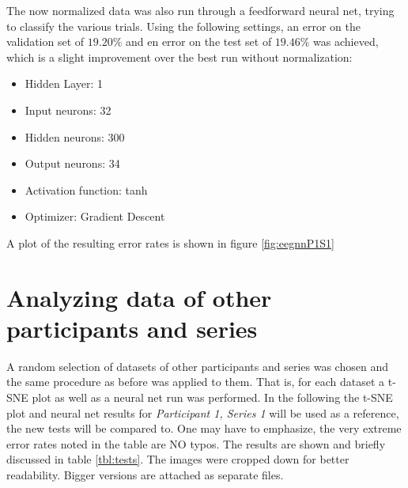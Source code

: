 \documentclass{article} %
\begin{document}
The now normalized data was also run through a feedforward neural net, trying to classify the various trials. Using the following settings, an error on the validation set of $19.20\%$ and en error on the test set of $19.46\%$ was achieved, which is a slight improvement over the best run without normalization:
\begin{itemize}
	\item Hidden Layer: 1
	\item Input neurons: 32
	\item Hidden neurons: 300
	\item Output neurons: 34
	\item Activation function: tanh
	\item Optimizer: Gradient Descent
\end{itemize}

A plot of the resulting error rates is shown in figure \ref{fig:eegnnP1S1}




\section{Analyzing data of other participants and series}
A random selection of datasets of other participants and series was chosen and the same procedure as before was applied to them. That is, for each dataset a t-SNE plot as well as a neural net run was performed. In the following the t-SNE plot and neural net results for \emph{Participant 1, Series 1} will be used as a reference, the new tests will be compared to. One may have to emphasize, the very extreme error rates noted in the table are NO typos. The results are shown and briefly discussed in table \ref{tbl:tests}. The images were cropped down for better readability. Bigger versions are attached as separate files.
\end{document}

